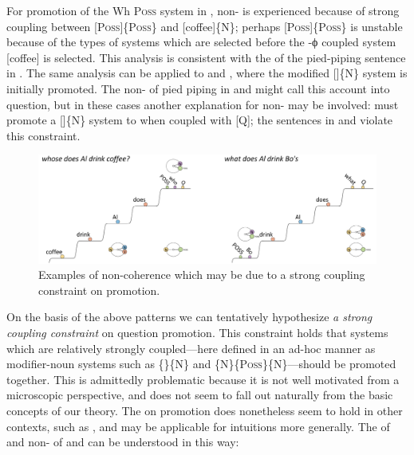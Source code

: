 For promotion of the {\textbar}Wh P\textsc{oss}{\textbar} system in , non- is experienced because of strong coupling between [P\textsc{oss}]\{P\textsc{oss}\} and [coffee]\{N\}; perhaps [P\textsc{oss}]\{P\textsc{oss}\} is unstable because of the types of systems which are selected before the -ϕ coupled system [coffee] is selected. This analysis is consistent with the  of the pied-piping sentence in . The same analysis can be applied to  and , where the modified []\{N\} system is initially promoted. The non- of pied piping in  and  might call this account into question, but in these cases another explanation for non- may be involved:  must promote a []\{N\} system to  when coupled with [Q]; the sentences in  and  violate this constraint. 

  
\begin{figure}
\includegraphics[width=\textwidth]{figures/Tilsen-img166.png}
\caption{Examples of non-coherence which may be due to a strong coupling constraint on promotion.}
\label{fig:7:22}
\end{figure}
 

  On the basis of the above patterns we can tentatively hypothesize \textit{a strong coupling constraint} on question promotion. This constraint holds that systems which are relatively strongly coupled—here defined in an ad-hoc manner as modifier-noun systems such as \{\}\{N\} and \{N\}\{P\textsc{oss}\}\{N\}—should be promoted together. This is admittedly problematic because it is not well motivated from a microscopic perspective, and does not seem to fall out naturally from the basic concepts of our theory. The  on promotion does nonetheless seem to hold in other contexts, such as , and may be applicable for  intuitions more generally. The  of  and non- of  and  can be understood in this way:

